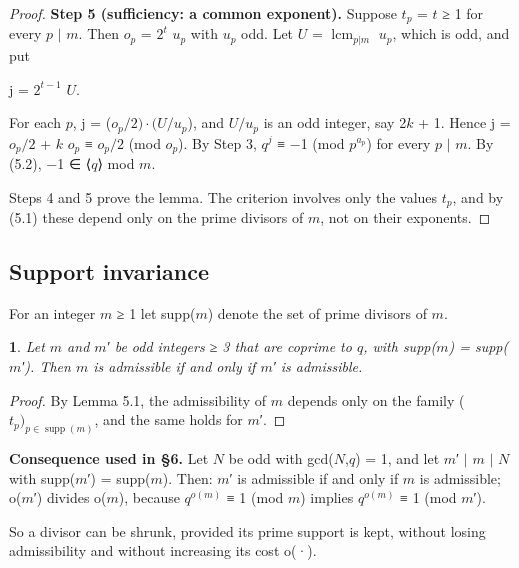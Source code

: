 \documentclass[pdflatex,sn-mathphys-num]{sn-jnl}
\theoremstyle{thmstyleone}
\newcommand{\thmxname}{}
\newtheorem*{thmxinner}{\thmxname}
\newenvironment{thmx}[1]{\renewcommand{\thmxname}{#1}\begin{thmxinner}}{\end{thmxinner}}
\theoremstyle{thmstylethree}
\begin{document}
\begin{proof}[Proof]
\textbf{Step 5 (sufficiency: a common exponent).} Suppose \(t_p\) = \(t\) ≥ 1 for every \(p\) \(\mid\) \(m\). Then \(o_p\) = \(2^t\) \(u_p\) with \(u_p\) odd. Let \(U\) = \(\operatorname{lcm}_{p|m}\) \(u_p\), which is odd, and put

\begin{center}j = \(2^{t−1}\) \(U\).\end{center}

For each \(p\), j = (\(o_p/2)·(U/u_p\)), and \(U/u_p\) is an odd integer, say 2\(k\) + 1. Hence j = \(o_p/2\) + \(k\) \(o_p\) ≡ \(o_p/2\) (mod \(o_p\)). By Step 3, \(q^j\) ≡ −1 (mod \(p^{a_p}\)) for every \(p\) \(\mid\) \(m\). By (5.2), −1 ∈ ⟨\(q\)⟩ mod \(m\).

Steps 4 and 5 prove the lemma. The criterion involves only the values \(t_p\), and by (5.1) these depend only on the prime divisors of \(m\), not on their exponents.

\end{proof}

\subsection{Support invariance}

For an integer \(m\) ≥ 1 let supp(\(m\)) denote the set of prime divisors of \(m\).

\begin{thmx}{Corollary 5.2 (support invariance)}

Let \(m\) and \(m\)′ be odd integers ≥ 3 that are coprime to \(q\), with supp(\(m\)) = supp(\(m\)′). Then \(m\) is admissible if and only if \(m\)′ is admissible.

\end{thmx}

\begin{proof}[Proof]

By Lemma 5.1, the admissibility of \(m\) depends only on the family (\(t_p)_{p∈\operatorname{supp}(m)}\), and the same holds for \(m\)′.

\end{proof}

\textbf{Consequence used in §6.} Let \(N\) be odd with gcd(\(N\),\(q\)) = 1, and let \(m\)′ \(\mid\) \(m\) \(\mid\) \(N\) with supp(\(m\)′) = supp(\(m\)). Then: \(m\)′ is admissible if and only if \(m\) is admissible; o(\(m\)′) divides o(\(m\)), because \(q^{o(m)}\) ≡ 1 (mod \(m\)) implies \(q^{o(m)}\) ≡ 1 (mod \(m\)′).

So a divisor can be shrunk, provided its prime support is kept, without losing admissibility and without increasing its cost o(·).
\end{document}

